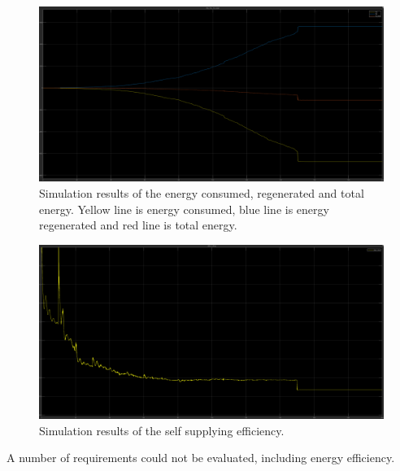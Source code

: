\begin{figure}
    \centering
    \includegraphics[width=\columnwidth]{images/energy_results.png}
    \caption{Simulation results of the energy consumed, regenerated and total energy. Yellow line is energy consumed, blue line is energy regenerated and red line is total energy.}
    \label{fig:energy_results_graph}
\end{figure}

\begin{figure}
    \centering
    \includegraphics[width=\columnwidth]{images/self_supplying.png}
    \caption{Simulation results of the self supplying efficiency.}
    \label{fig:self_supplying}
\end{figure}

A number of requirements could not be evaluated, including energy efficiency.
